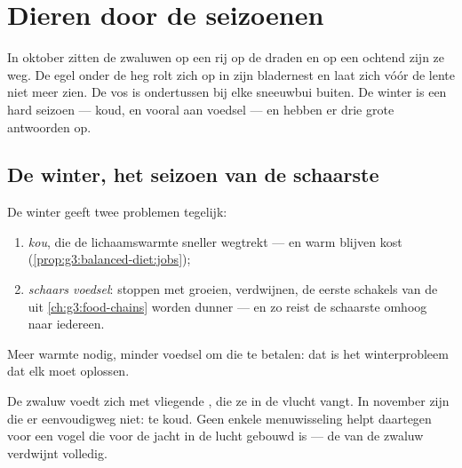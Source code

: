 \chapter{Dieren door de seizoenen}\label{ch:g3:animals-through-seasons}

In oktober zitten de zwaluwen op een rij op de draden en op een ochtend
zijn ze weg. De egel onder de heg rolt zich op in zijn bladernest en
laat zich vóór de lente niet meer zien. De vos is ondertussen bij elke
sneeuwbui buiten. De winter is een hard seizoen --- koud, en vooral
 aan voedsel --- en  hebben er drie grote antwoorden op.

\section{De winter, het seizoen van de schaarste}

\begin{proposition}\label{prop:g3:animals-through-seasons:problem}
De winter geeft  twee problemen tegelijk:
\begin{enumerate}
  \item \emph{kou}, die de lichaamswarmte sneller wegtrekt --- en warm
        blijven kost 
        (\cref{prop:g3:balanced-diet:jobs});
  \item \emph{schaars voedsel}:  stoppen met groeien, 
        verdwijnen, de eerste schakels van de  uit
        \cref{ch:g3:food-chains} worden dunner --- en zo reist de
        schaarste omhoog naar iedereen.
\end{enumerate}
Meer warmte nodig, minder voedsel om die te betalen: dat is het
winterprobleem dat elk  moet oplossen.
\end{proposition}
\admitted

\begin{example}\label{ex:g3:animals-through-seasons:insects}
De zwaluw voedt zich met vliegende , die ze in de vlucht vangt.
In november zijn die er eenvoudigweg niet: te koud. Geen enkele
menuwisseling helpt daartegen voor een vogel die voor de jacht in de
lucht gebouwd is --- de  van de zwaluw verdwijnt volledig.
\end{example}

